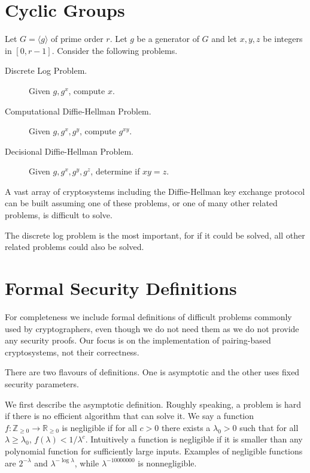 \section{Cyclic Groups}

Let $G = \langle g \rangle$ of prime order $r$.
Let $g$ be a generator of $G$
and let $x, y, z$ be integers in $[0, r-1]$.
Consider the following problems.

\begin{description}
\item [Discrete Log Problem.]
Given $g, g^x$, compute $x$.
\item [Computational Diffie-Hellman Problem.]
Given $g, g^x, g^y$, compute $g^{x y}$.
\item [Decisional Diffie-Hellman Problem.]
Given $g, g^x, g^y, g^z$, determine if $x y = z$.
\end{description}

A vast array of cryptosystems including the Diffie-Hellman key
exchange protocol can be built assuming one of these problems,
or one of many other related problems, is difficult to solve.

The discrete log problem is the most important, for if it could be
solved, all other related problems could also be solved.

\section{Formal Security Definitions}

For completeness we include formal definitions of difficult problems
commonly used by cryptographers, even though
we do not need them as we do not provide any security proofs. Our
focus is on the implementation of pairing-based cryptosystems, not
their correctness.

There are two flavours of definitions. One is asymptotic and the
other uses fixed security parameters.

We first describe the asymptotic definition. Roughly speaking, a problem
is hard if there is no efficient algorithm that can solve it.
We say a function $f:\mathbb{Z}_{\ge 0} \rightarrow \mathbb{R}_{\ge 0}$
is negligible if for all $c > 0$ there exists a $\lambda_0 > 0$ such that
for all $\lambda \ge \lambda_0$, $f(\lambda) < 1 / \lambda^c$.
Intuitively a function is negligible if it is smaller than any polynomial
function for sufficiently large inputs. Examples of negligible functions
are $2^{-\lambda}$ and $\lambda^{-\log\lambda}$, while $\lambda^{-10000000}$
is nonnegligible.


